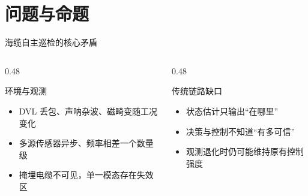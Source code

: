 \section{问题与命题}

\begin{frame}{海缆自主巡检的核心矛盾}
  \begin{columns}[T,onlytextwidth]
    \begin{column}{0.48\textwidth}
      \begin{block}{环境与观测}
        \begin{itemize}
          \item DVL 丢包、声呐杂波、磁畸变随工况变化
          \item 多源传感器异步、频率相差一个数量级
          \item 掩埋电缆不可见，单一模态存在失效区
        \end{itemize}
      \end{block}
    \end{column}
    \begin{column}{0.48\textwidth}
      \begin{alertblock}{传统链路缺口}
        \begin{itemize}
          \item 状态估计只输出“在哪里”
          \item 决策与控制不知道“有多可信”
          \item 观测退化时仍可能维持原有控制强度
        \end{itemize}
      \end{alertblock}
    \end{column}
  \end{columns}

\end{frame}

